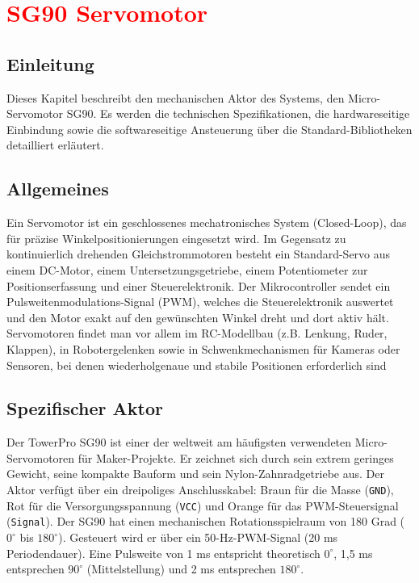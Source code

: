 %
%

\chapter{\textcolor{red}{SG90 Servomotor}}

\section*{Einleitung}
Dieses Kapitel beschreibt den mechanischen Aktor des Systems, den Micro-Servomotor SG90. Es werden die technischen Spezifikationen, die hardwareseitige Einbindung sowie die softwareseitige Ansteuerung über die Standard-Bibliotheken detailliert erläutert.

\section{Allgemeines}
Ein Servomotor ist ein geschlossenes mechatronisches System (Closed-Loop), das für präzise Winkelpositionierungen eingesetzt wird. Im Gegensatz zu kontinuierlich drehenden Gleichstrommotoren besteht ein Standard-Servo aus einem DC-Motor, einem Untersetzungsgetriebe, einem Potentiometer zur Positionserfassung und einer Steuerelektronik. Der Mikrocontroller sendet ein Pulsweitenmodulations-Signal (PWM), welches die Steuerelektronik auswertet und den Motor exakt auf den gewünschten Winkel dreht und dort aktiv hält. Servomotoren findet man vor allem im RC-Modellbau (z.B. Lenkung, Ruder, Klappen), in Robotergelenken sowie in Schwenkmechanismen für Kameras oder Sensoren, bei denen wiederholgenaue und stabile Positionen erforderlich sind

\section{Spezifischer Aktor}
Der TowerPro SG90 ist einer der weltweit am häufigsten verwendeten Micro-Servomotoren für Maker-Projekte. Er zeichnet sich durch sein extrem geringes Gewicht, seine kompakte Bauform und sein Nylon-Zahnradgetriebe aus. Der Aktor verfügt über ein dreipoliges Anschlusskabel: Braun für die Masse (\texttt{GND}), Rot für die Versorgungsspannung (\texttt{VCC}) und Orange für das PWM-Steuersignal (\texttt{Signal}). Der SG90 hat einen mechanischen Rotationsspielraum von 180 Grad ($0^\circ$ bis $180^\circ$). Gesteuert wird er über ein 50-Hz-PWM-Signal (20 ms Periodendauer). Eine Pulsweite von 1 ms entspricht theoretisch $0^\circ$, 1,5 ms entsprechen $90^\circ$ (Mittelstellung) und 2 ms entsprechen $180^\circ$.\cite{Raj:2026}  


